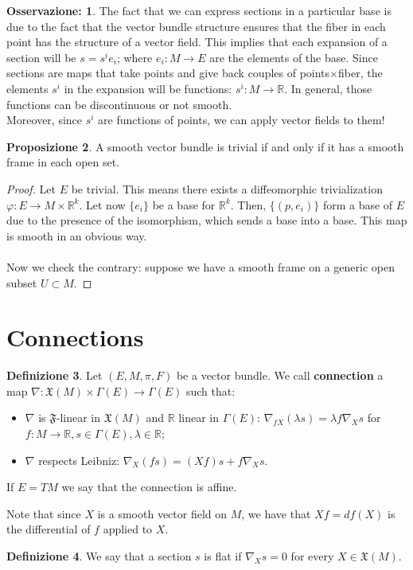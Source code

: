 \documentclass[12pt,a4paper]{report}
\theoremstyle{definition}
\newtheorem{Def}{Definizione}[chapter]
\theoremstyle{Theorem}
\newtheorem{Prop}[Def]{Proposizione}
\theoremstyle{definition}
\theoremstyle{definition}
\theoremstyle{definition}
\newtheorem{Obs}[Def]{Osservazione:}
\begin{document}
	\begin{Obs}
		The fact that we can express sections in a particular base is due to the fact that the vector bundle structure ensures that the fiber in each point has the structure of a vector field. This implies that each expansion of a section will be $s=s^ie_i$; where $e_i:M\rightarrow E$ are the elements of the base. Since sections are maps that take points and give back couples of points$\times$fiber, the elements $s^i$ in the expansion will be functions: $s^i:M\rightarrow \mathbb{R}$. In general, those functions can be discontinuous or not smooth.\\
		Moreover, since $s^i$ are functions of points, we can apply vector fields to them!
	\end{Obs}
	\begin{Prop}
		A smooth vector bundle is trivial if and only if it has a smooth frame in each open set.
	\end{Prop}
	\begin{proof}
		Let $E$ be trivial. This means there exists a diffeomorphic trivialization $\varphi:E\rightarrow M\times \mathbb{R}^k$. Let now $\{e_i\}$ be a base for $\mathbb{R}^k$. Then, $\{(p,e_i)\}$ form a base of $E$ due to the presence of the isomorphism, which sends a base into a base. This map is smooth in an obvious way.\\
		\\
		Now we check the contrary: suppose we have a smooth frame on a generic open subset $U\subset M$.
	\end{proof}
	\section{Connections}
	\begin{Def}\label{Def_5.7}
		Let $(E,M,\pi,F)$ be a vector bundle. We call \textbf{connection} a map $\nabla:\mathfrak{X}(M)\times\Gamma(E)\rightarrow\Gamma(E)$ such that:
		\begin{itemize}
			\item $\nabla$ is $\mathfrak{F}$-linear in $\mathfrak{X}(M)$ and $\mathbb{R}$ linear in $\Gamma(E)$: $\nabla_{fX}(\lambda s)=\lambda f\nabla_X s$ for $f:M\rightarrow \mathbb{R}, s\in\Gamma(E),\lambda\in\mathbb{R}$;
			\item $\nabla$ respects Leibniz: $\nabla_X (fs)=(Xf)s+f\nabla_X s$.
		\end{itemize}
		If $E=TM$ we say that the connection is affine.
	\end{Def}
	Note that since $X$ is a smooth vector field on $M$, we have that $Xf=df(X)$ is the differential of $f$ applied to $X$.
	\begin{Def}\label{Def_5.8}
		We say that a section $s$ is flat if $\nabla_X s=0$ for every $X\in \mathfrak{X}(M)$.
	\end{Def}
\end{document}
